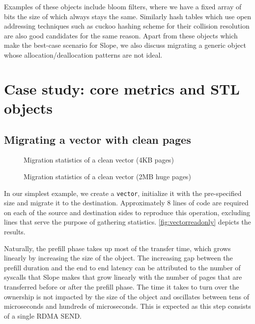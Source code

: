 Examples of these objects include bloom filters, where we have a fixed
array of bits the size of which always stays the same.
Similarly hash tables which use open addressing techniques such as cuckoo
hashing scheme for their collision resolution are also good candidates for the
same reason.
Apart from these objects which make the best-case scenario for Slope, we also
discuss migrating a generic object whose allocation/deallocation patterns are not
ideal.

\section{Case study: core metrics and STL objects}
\subsection{Migrating a vector with clean pages}
\label{sec:cleanvec}

\begin{figure}[tp]
    \begin{center}
        
    \end{center}
    \caption{Migration statistics of a clean vector (4KB pages)}
    \label{fig:vectorreadonly}
\end{figure}

\begin{figure}[tp]
    \begin{center}
        
    \end{center}
    \caption{Migration statistics of a clean vector (2MB huge pages)}
    \label{fig:vectorreadonlyhp}
\end{figure}

In our simplest example, we create a \texttt{vector}, initialize it with the
pre-specified size and migrate it to the destination. Approximately $8$ lines
of code are required on each of the source and destination sides to reproduce
this operation, excluding lines that serve the purpose of gathering statistics.
\autoref{fig:vectorreadonly} depicts the results.

Naturally, the prefill phase takes up most of the transfer time, which grows
linearly by increasing the size of the object. The increasing gap between the
prefill duration and the end to end latency can be attributed to the number
of syscalls that Slope makes that grow linearly with the
number of pages that are transferred before or after the prefill phase. The
time it takes to turn over the ownership is not impacted by the
size of the object and oscillates between tens of microseconds and hundreds
of microseconds. This is expected as this step consists of a single RDMA SEND.

